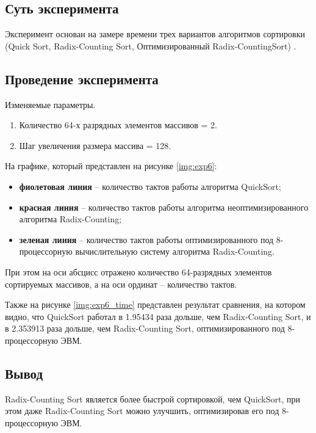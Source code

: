 \subsection{Суть эксперимента}  
Эксперимент основан на замере времени трех вариантов алгоритмов сортировки (Quick Sort, Radix-Counting Sort, Оптимизированный Radix-CountingSort) .


\subsection{Проведение эксперимента}

Изменяемые параметры.

\begin{enumerate}
	\item Количество 64-х разрядных элементов массивов = 2.
	\item Шаг увеличения размера массива = 128.
\end{enumerate}

На графике, который представлен на рисунке \ref{img:exp6}:
\begin{itemize}
	\item \textbf{фиолетовая линия} -- количество тактов работы алгоритма QuickSort;
	\item \textbf{красная линия} -- количество тактов работы алгоритма неоптимизированного алгоритма Radix-Counting;
	\item \textbf{зеленая линия} -- количество тактов работы оптимизированного под 8-процессорную вычислительную систему алгоритма Radix-Counting.
\end{itemize}

При этом на оси абсцисс отражено количество 64-разрядных элементов сортируемых массивов, а на оси ординат -- количество тактов.


%

Также на рисунке \ref{img:exp6_time} представлен результат сравнения, на котором видно, что QuickSort работал в 1.95434 раза дольше, чем Radix-Counting Sort, и в 2.353913 раза дольше, чем Radix-Counting Sort, оптимизированного под 8-процессорную ЭВМ.


\clearpage



\subsection{Вывод}

Radix-Counting Sort является более быстрой сортировкой, чем QuickSort, при этом даже Radix-Counting Sort можно улучшить, оптимизировав его под 8-процессорную ЭВМ.
